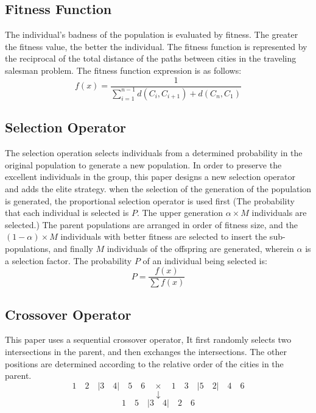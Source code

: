 \documentclass[12pt]{article}
\begin{document}
\subsection{Fitness Function}
The individual's badness of the population is evaluated by fitness. The greater the fitness value, the better the individual. The fitness function is represented by the reciprocal of the total distance of the paths between cities in the traveling salesman problem.
The fitness function expression is as follows:
\begin{equation}
    f(x)=\frac{1}{\sum_{i=1}^{n-1} d\left(C_{i}, C_{i+1}\right)+d\left(C_{n}, C_{1}\right)}
\end{equation}

\subsection{Selection Operator}
The selection operation selects individuals from a determined probability in the original population to generate a new population. 
In order to preserve the excellent individuals in the group, this paper designs a new selection operator and adds the elite strategy.
when the selection of the generation of the population is generated, the proportional selection operator is used first
(The probability that each individual is selected is $P$. The upper generation $\alpha \times M$ individuals are selected.)
The parent populations are arranged in order of fitness size, and the $(1-\alpha)\times M$ individuals with better fitness are selected to insert the sub-populations, and finally $M$ individuals of the offspring are generated, wherein $\alpha$ is a selection factor.
The probability $P$ of an individual being selected is:
\begin{equation}
    P=\frac{f(x)}{\sum f(x)}
\end{equation}

\subsection{Crossover Operator}
This paper uses a sequential crossover operator, It first randomly selects two intersections in the parent, and then exchanges the intersections. The other positions are determined according to the relative order of the cities in the parent.
\[1\quad 2\quad |3\quad 4|\quad 5\quad 6 \quad \times \quad 1\quad 3\quad |5\quad 2|\quad 4\quad 6 \]
\[\downarrow \]
\[1\quad 5\quad |3\quad 4|\quad 2\quad 6\]
\end{document}
